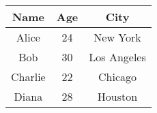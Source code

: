 \centering
\begin{tabular}{|c|c|c|}
\hline
Name & Age & City \\
\hline \hline
Alice & 24 & New York \\
\hline
Bob & 30 & Los Angeles \\
\hline
Charlie & 22 & Chicago \\
\hline
Diana & 28 & Houston \\
\hline
\end{tabular}